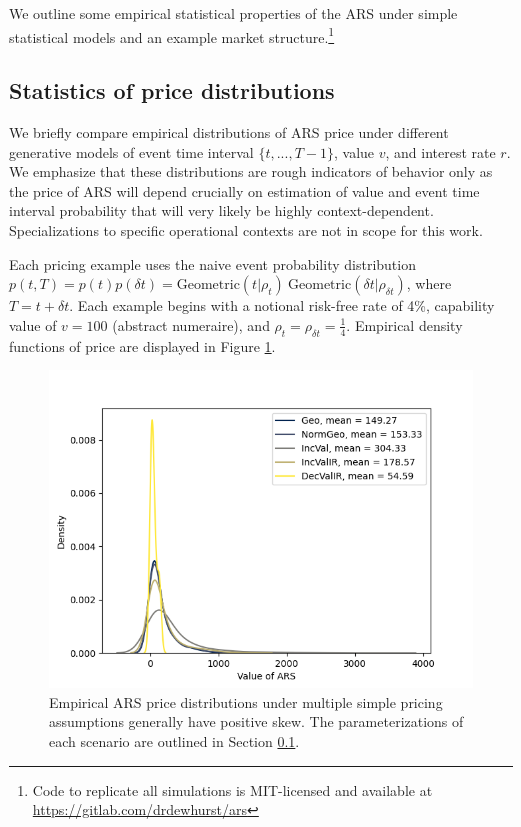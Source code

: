 \documentclass{article}
\begin{document}
We outline some empirical statistical properties of the ARS under
simple statistical models and an example market structure.\footnote{
Code to replicate all simulations is MIT-licensed and available at \href{https://gitlab.com/drdewhurst/ars}{https://gitlab.com/drdewhurst/ars}
}

\subsection{Statistics of price distributions}\label{sec:ars-pricing}

We briefly compare empirical distributions of ARS price under different generative models of event time interval $\{t,...,T-1\}$, value $v$, and interest rate $r$. 
We emphasize that these distributions are rough indicators of behavior only as the price of ARS will depend crucially on estimation of value and event time interval probability that will very likely be highly context-dependent.
Specializations to specific operational contexts are not in scope for this work.

Each pricing example uses the naive event probability distribution 
$p(t, T) = p(t) p(\delta t) = \mathrm{Geometric}(t | \rho_t)\ \mathrm{Geometric}(\delta t | \rho_{\delta t})$,
where $T = t + \delta t$.
Each example begins with a notional risk-free rate of 4\%, capability value of $v = 100$ (abstract numeraire), and $\rho_t = \rho_{\delta t} = \frac{1}{4}$.
Empirical density functions of price are displayed in Figure \ref{fig:ars-pricing-model}.
\begin{figure}
    \centering
    \includegraphics[width=0.75\linewidth]{ars-pricing-model-compare.png}
    \caption{
    Empirical ARS price distributions under multiple simple pricing assumptions generally have positive skew. The parameterizations of each scenario are outlined in Section \ref{sec:ars-pricing}.
    }
    \label{fig:ars-pricing-model}
\end{figure}
\end{document}
